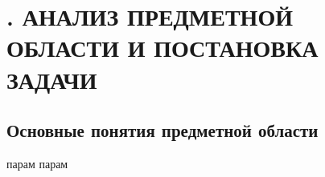 \sectionbreak \section*{
  \cyrillicfont 
  \fontsize{14pt}{0pt}\selectfont
  \englishfont 
  . АНАЛИЗ ПРЕДМЕТНОЙ ОБЛАСТИ И ПОСТАНОВКА ЗАДАЧИ
}

\titlespace
\subsection*{ 
  \cyrillicfont 
  \fontsize{14pt}{0pt}\selectfont
  \englishfont
   Основные понятия предметной области
} 
\titlespace

{\cyrillicfont 
\fontsize{13pt}{16.25pt}\selectfont 
\englishfont 

  \par \redline парам парам

  \par
}

